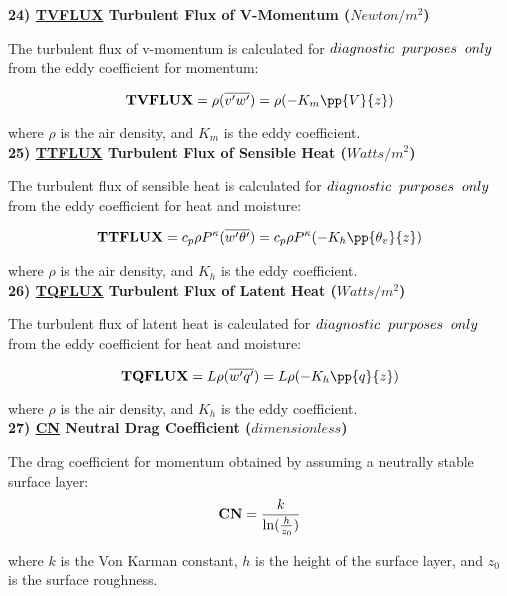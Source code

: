 \noindent
{\bf 24)  \underline {TVFLUX}  Turbulent Flux of V-Momentum ($Newton/m^2$) }

\noindent
The turbulent flux of v-momentum is calculated for $diagnostic \hspace{.2cm} purposes 
\hspace{.2cm} only$ from the eddy coefficient for momentum:

\[
{\bf TVFLUX} =  {\rho } {(\overline{v^{\prime}w^{\prime}})} = 
 {\rho } {(- K_m \pp{V}{z})}
\]
 
\noindent
where $\rho$ is the air density, and $K_m$ is the eddy coefficient.
\\


\noindent
{\bf 25)  \underline {TTFLUX}  Turbulent Flux of Sensible Heat ($Watts/m^2$) }

\noindent
The turbulent flux of sensible heat is calculated for $diagnostic \hspace{.2cm} purposes 
\hspace{.2cm} only$ from the eddy coefficient for heat and moisture:

\noindent
\[
{\bf TTFLUX} = c_p {\rho }  
P^{\kappa}{(\overline{w^{\prime}\theta^{\prime}})}
 = c_p  {\rho } P^{\kappa}{(- K_h \pp{\theta_v}{z})}
\]
 
\noindent
where $\rho$ is the air density, and $K_h$ is the eddy coefficient.
\\


\noindent
{\bf 26)  \underline {TQFLUX}  Turbulent Flux of Latent Heat ($Watts/m^2$) }

\noindent
The turbulent flux of latent heat is calculated for $diagnostic \hspace{.2cm} purposes 
\hspace{.2cm} only$ from the eddy coefficient for heat and moisture:

\noindent
\[
{\bf TQFLUX} = {L {\rho } (\overline{w^{\prime}q^{\prime}})} = 
{L {\rho }(- K_h \pp{q}{z})}
\]
 
\noindent
where $\rho$ is the air density, and $K_h$ is the eddy coefficient.
\\

 
\noindent
{\bf 27)  \underline {CN}  Neutral Drag Coefficient ($dimensionless$) }

\noindent
The drag coefficient for momentum obtained by assuming a neutrally stable surface layer:
\[
{\bf CN} = { k \over { \ln({h \over {z_0}})} }
\]

\noindent
where $k$ is the Von Karman constant, $h$ is the height of the surface layer, and
$z_0$ is the surface roughness. 

